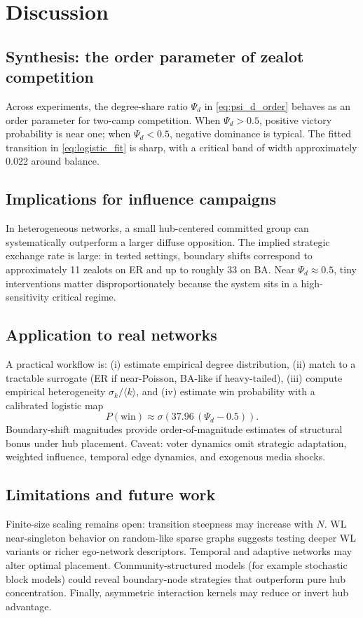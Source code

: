 \documentclass[12pt, a4paper]{article}
\begin{document}
\section{Discussion}\label{sec:discussion}
\subsection{Synthesis: the order parameter of zealot competition}
Across experiments, the degree-share ratio $\Psi_d$ in \cref{eq:psi_d_order} behaves as an order parameter for two-camp competition. When $\Psi_d>0.5$, positive victory probability is near one; when $\Psi_d<0.5$, negative dominance is typical. The fitted transition in \cref{eq:logistic_fit} is sharp, with a critical band of width approximately 0.022 around balance.

\subsection{Implications for influence campaigns}
In heterogeneous networks, a small hub-centered committed group can systematically outperform a larger diffuse opposition. The implied strategic exchange rate is large: in tested settings, boundary shifts correspond to approximately 11 zealots on ER and up to roughly 33 on BA. Near $\Psi_d\approx 0.5$, tiny interventions matter disproportionately because the system sits in a high-sensitivity critical regime.

\subsection{Application to real networks}
A practical workflow is: (i) estimate empirical degree distribution, (ii) match to a tractable surrogate (ER if near-Poisson, BA-like if heavy-tailed), (iii) compute empirical heterogeneity $\sigma_k/\langle k\rangle$, and (iv) estimate win probability with a calibrated logistic map
\begin{equation}\label{eq:practical_logistic}
P(\text{win})\approx \sigma\!\left(37.96\,(\Psi_d-0.5)\right).
\end{equation}
Boundary-shift magnitudes provide order-of-magnitude estimates of structural bonus under hub placement. Caveat: voter dynamics omit strategic adaptation, weighted influence, temporal edge dynamics, and exogenous media shocks.

\subsection{Limitations and future work}
Finite-size scaling remains open: transition steepness may increase with $N$. WL near-singleton behavior on random-like sparse graphs suggests testing deeper WL variants or richer ego-network descriptors. Temporal and adaptive networks may alter optimal placement. Community-structured models (for example stochastic block models) could reveal boundary-node strategies that outperform pure hub concentration. Finally, asymmetric interaction kernels may reduce or invert hub advantage.
\end{document}
